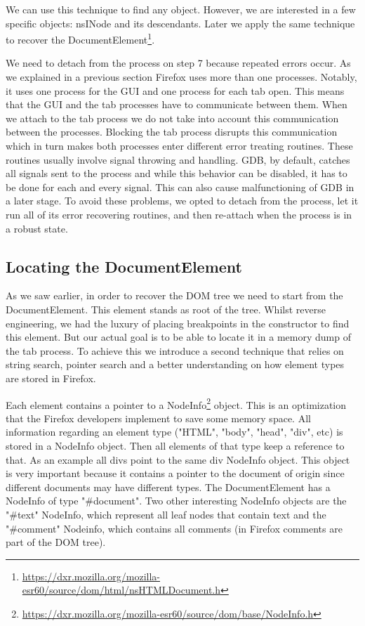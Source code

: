 We can use this technique to find any object. However, we are
interested in a few specific objects: nsINode and its
descendants. Later we apply the same technique to recover the
DocumentElement\footnote{\url{https://dxr.mozilla.org/mozilla-esr60/source/dom/html/nsHTMLDocument.h}}.

We need to detach from the process on step 7 because repeated
errors occur. As we explained in a previous section Firefox uses more
than one processes. Notably, it uses one process for the GUI and one
process for each tab open. This means that the GUI and the tab
processes have to communicate between them. When we attach to the tab
process we do not take into account this communication between the
processes. Blocking the tab process disrupts this communication which
in turn makes both processes enter different error treating
routines. These routines usually involve signal throwing and
handling. GDB, by default, catches all signals sent to the process and
while this behavior can be disabled, it has to be done for each and
every signal. This can also cause malfunctioning of GDB in a later
stage. To avoid these problems, we opted to detach from the
process, let it run all of its error recovering routines, and then
re-attach when the process is in a robust state.

\subsection{Locating the DocumentElement}
As we saw earlier, in order to recover the DOM tree we need to start
from the DocumentElement. This element stands as root of the
tree. Whilst reverse engineering, we had the luxury of placing
breakpoints in the constructor to find this element. But our actual
goal is to be able to locate it in a memory dump of the tab
process. To achieve this we introduce a second technique that relies
on string search, pointer search and a better understanding on how
element types are stored in Firefox.

Each element contains a pointer to a
NodeInfo\footnote{\url{https://dxr.mozilla.org/mozilla-esr60/source/dom/base/NodeInfo.h}}
object. This is an optimization that the Firefox developers implement
to save some memory space. All information regarding an element type
("HTML", "body", "head", "div", etc) is stored in a NodeInfo
object. Then all elements of that type keep a reference to that. As an
example all divs point to the same div NodeInfo object. This object is
very important because it contains a pointer to the document of origin
since different documents may have different types. The
DocumentElement has a NodeInfo of type "\#document". Two other
interesting NodeInfo objects are the "\#text" NodeInfo, which
represent all leaf nodes that contain text and the "\#comment"
Nodeinfo, which contains all comments (in Firefox comments are part of
the DOM tree).

